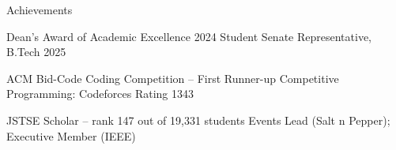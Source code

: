 \documentclass[10pt]{resume}
\begin{document}
    \begin{rSection}{Achievements}
        \begin{rSubsection}{}{}
            \item Dean's Award of Academic Excellence 2024 \hfill Student Senate Representative, B.Tech 2025
            \item ACM Bid-Code Coding Competition -- First Runner-up \hfill Competitive Programming: Codeforces Rating 1343
            \item JSTSE Scholar -- rank 147 out of 19,331 students \hfill Events Lead (Salt n Pepper); Executive Member (IEEE)
        \end{rSubsection}
    \end{rSection}
\end{document}
